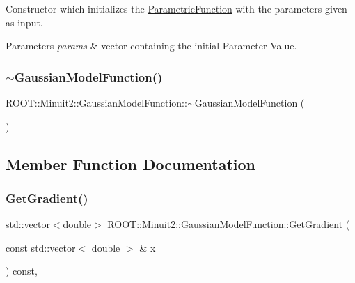 Constructor which initializes the \mbox{\hyperlink{classROOT_1_1Minuit2_1_1ParametricFunction}{Parametric\+Function}} with the parameters given as input.


\begin{DoxyParams}{Parameters}
{\em params} & vector containing the initial Parameter Value. \\
\hline
\end{DoxyParams}
\mbox{\label{classROOT_1_1Minuit2_1_1GaussianModelFunction_abc4e84ccbc432e7706d8407c1d2efd6a}} 
\subsubsection{\texorpdfstring{$\sim$GaussianModelFunction()}{~GaussianModelFunction()}}
{\footnotesize\ttfamily R\+O\+O\+T\+::\+Minuit2\+::\+Gaussian\+Model\+Function\+::$\sim$\+Gaussian\+Model\+Function (\begin{DoxyParamCaption}{ }\end{DoxyParamCaption})\hspace{0.3cm}{\ttfamily [inline]}}



\subsection{Member Function Documentation}
\mbox{\label{classROOT_1_1Minuit2_1_1GaussianModelFunction_ac81a3c5531a291b8a9c3af533de07195}} 
\subsubsection{\texorpdfstring{GetGradient()}{GetGradient()}}
{\footnotesize\ttfamily std\+::vector$<$double$>$ R\+O\+O\+T\+::\+Minuit2\+::\+Gaussian\+Model\+Function\+::\+Get\+Gradient (\begin{DoxyParamCaption}\item[{const std\+::vector$<$ double $>$ \&}]{x }\end{DoxyParamCaption}) const\hspace{0.3cm}{\ttfamily [inline]}, {\ttfamily [virtual]}}

